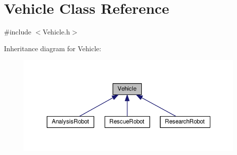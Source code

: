 \hypertarget{class_vehicle}{\section{Vehicle Class Reference}
\label{class_vehicle}
}


{\ttfamily \#include $<$Vehicle.\-h$>$}



Inheritance diagram for Vehicle\-:
\nopagebreak
\begin{figure}[H]
\begin{center}
\leavevmode
\includegraphics[width=350pt]{class_vehicle__inherit__graph}
\end{center}
\end{figure}
